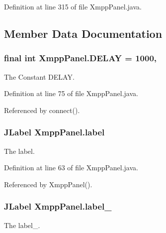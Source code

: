 Definition at line 315 of file Xmpp\-Panel.\-java.



\subsection{Member Data Documentation}
\hypertarget{class_xmpp_panel_a9910ab88b95a942edaed54e8ab43cd98}{
\subsubsection[{D\-E\-L\-A\-Y}]{\setlength{\rightskip}{0pt plus 5cm}final int Xmpp\-Panel.\-D\-E\-L\-A\-Y = 1000\hspace{0.3cm}{\ttfamily [static]}, {\ttfamily [private]}}}\label{class_xmpp_panel_a9910ab88b95a942edaed54e8ab43cd98}
The Constant D\-E\-L\-A\-Y. 

Definition at line 75 of file Xmpp\-Panel.\-java.



Referenced by connect().

\hypertarget{class_xmpp_panel_a0086126eead014c8117e377a69311589}{
\subsubsection[{label}]{\setlength{\rightskip}{0pt plus 5cm}J\-Label Xmpp\-Panel.\-label\hspace{0.3cm}{\ttfamily [private]}}}\label{class_xmpp_panel_a0086126eead014c8117e377a69311589}
The label. 

Definition at line 63 of file Xmpp\-Panel.\-java.



Referenced by Xmpp\-Panel().

\hypertarget{class_xmpp_panel_a380efe027c76a0a6a937d2c9ca73f804}{
\subsubsection[{label\-\_\-1}]{\setlength{\rightskip}{0pt plus 5cm}J\-Label Xmpp\-Panel.\-label\-\_\hspace{0.3cm}{\ttfamily [private]}}}\label{class_xmpp_panel_a380efe027c76a0a6a937d2c9ca73f804}
The label\-\_. 

